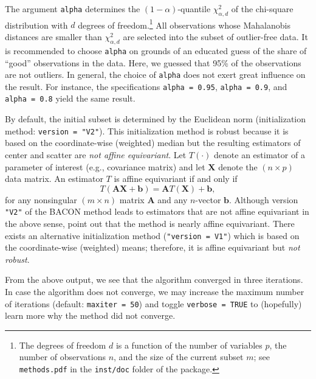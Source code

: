 \documentclass[a4paper,oneside,11pt,DIV=12]{scrartcl}
\newcommand{\code}[1]{{\texttt{#1}}}
\begin{document}
\noindent The argument \code{alpha} determines the $(1-\alpha)$-quantile $\chi_{\alpha,d}^2$ of the chi-square distribution with $d$ degrees of freedom.\footnote{The degrees of freedom $d$ is a function of the number of variables $p$, the number of observations $n$, and the size of the current subset $m$; see \code{methods.pdf} in the \code{inst/doc} folder of the package.} All observations whose Mahalanobis distances are smaller than $\chi_{\alpha, d}^2$ are selected into the subset of outlier-free data. It is recommended to choose \code{alpha} on grounds of an educated guess of the share of ``good'' observations in the data. Here, we guessed that 95\% of the observations are not outliers. In general, the choice of \code{alpha} does not exert great influence on the result. For instance, the specifications \code{alpha = 0.95}, \code{alpha = 0.9}, and \code{alpha = 0.8} yield the same result.

By default, the initial subset is determined by the Euclidean norm (initialization method: \code{version = "V2"}). This initialization method is robust because it is based on the coordinate-wise (weighted) median but the resulting estimators of center and scatter are \emph{not affine equivariant}. Let $T(\cdot)$ denote an estimator of a parameter of interest (e.g., covariance matrix) and let $\bm X$ denote the $(n \times p)$ data matrix. An estimator $T$ is affine equivariant if and only if 
\begin{equation*}
	T(\bm A \bm X + \bm b) = \bm A T(\bm X) + \bm b, 
\end{equation*}
\noindent for any nonsingular $(m \times n)$ matrix $\bm A$ and any $n$-vector $\bm b$. Although version \code{"V2"} of the BACON method leads to estimators that are not affine equivariant in the above sense, \citet{billor_hadi_etal_2000} point out that the method is nearly affine equivariant. There exists an alternative initialization method (\code{"version = V1"}) which is based on the coordinate-wise (weighted) means; therefore, it is affine equivariant but \emph{not robust}. 

From the above output, we see that the algorithm converged in three iterations. In case the algorithm does not converge, we may increase the maximum number of iterations (default: \code{maxiter = 50}) and toggle \code{verbose = TRUE} to (hopefully) learn more why the method did not converge.  
\end{document}
